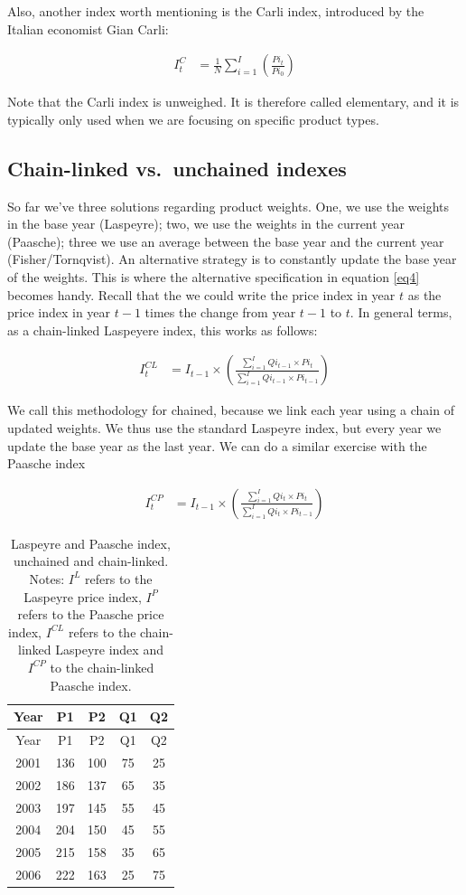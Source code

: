 \documentclass[]{book}
\begin{document}
Also, another index worth mentioning is the Carli index, introduced by the Italian economist Gian Carli:

\begin{align}
   I_t^{C}&=\frac{1}{N}\sum^I_{i=1}\left(\frac{Pi_t}{Pi_0}\right)
    \label{eq13}
\end{align}

Note that the Carli index is unweighed. It is therefore called elementary, and it is typically only used when we are focusing on specific product types.

\hypertarget{chain-linked-vs.-unchained-indexes}{%
\subsection{Chain-linked vs.~unchained indexes}\label{chain-linked-vs.-unchained-indexes}}

So far we've three solutions regarding product weights. One, we use the weights in the base year (Laspeyre); two, we use the weights in the current year (Paasche); three we use an average between the base year and the current year (Fisher/Tornqvist). An alternative strategy is to constantly update the base year of the weights. This is where the alternative specification in equation \eqref{eq4} becomes handy. Recall that the we could write the price index in year \(t\) as the price index in year \(t-1\) times the change from year \(t-1\) to \(t\). In general terms, as a chain-linked Laspeyere index, this works as follows:

\begin{align}
   I_t^{CL}&=I_{t-1}\times  \left(\frac{\sum^I_{i=1} Qi_{t-1} \times Pi_t}{\sum^I_{i=1}Qi_{t-1} \times Pi_{t-1}}\right)
\end{align}

We call this methodology for chained, because we link each year using a chain of updated weights. We thus use the standard Laspeyre index, but every year we update the base year as the last year. We can do a similar exercise with the Paasche index

\begin{align}
   I_t^{CP}&=I_{t-1}\times  \left(\frac{\sum^I_{i=1} Qi_{t} \times Pi_t}{\sum^I_{i=1}Qi_{t} \times Pi_{t-1}}\right)
\end{align}

\begin{longtable}[]{@{}ccccc@{}}
\caption{\label{tab:price6} Laspeyre and Paasche index, unchained and chain-linked. Notes: \(I^L\) refers to the Laspeyre price index, \(I^P\) refers to the Paasche price index, \(I^{CL}\) refers to the chain-linked Laspeyre index and \(I^{CP}\) to the chain-linked Paasche index.}\tabularnewline
\toprule
Year & P1 & P2 & Q1 & Q2\tabularnewline
\midrule
\endfirsthead
\toprule
Year & P1 & P2 & Q1 & Q2\tabularnewline
\midrule
\endhead
2001 & 136 & 100 & 75 & 25\tabularnewline
2002 & 186 & 137 & 65 & 35\tabularnewline
2003 & 197 & 145 & 55 & 45\tabularnewline
2004 & 204 & 150 & 45 & 55\tabularnewline
2005 & 215 & 158 & 35 & 65\tabularnewline
2006 & 222 & 163 & 25 & 75\tabularnewline
\bottomrule
\end{longtable}
\end{document}
